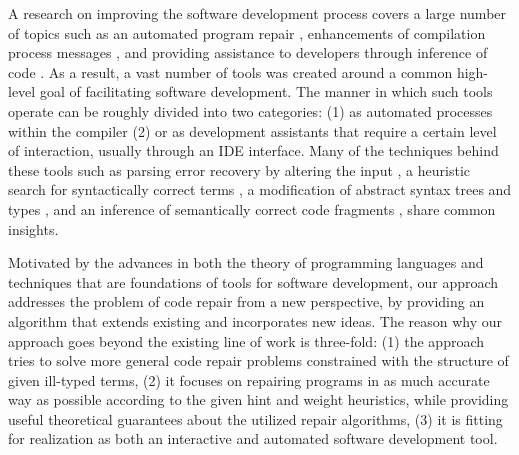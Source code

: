 A research on improving the software development process covers a large number of topics such as an automated
program repair
\cite{LeGoues:2012:ROI:2330163.2330296,WeiETAL10AutomatedFixingProgramsContracts,PeiETAL11CodebasedAutomatedProgramFixing},
enhancements of compilation process messages
\cite{Burke87apractical,Hammond198451,Lerner:2007:STM:1250734.1250783}, and
providing assistance to developers through inference of code
\cite{GveroETAL13CompleteCompletionTypesWeights,MandelinetALL2005Jungloid,KneussETAL13SynthesisModuloRecursiveFunctions,KuncakETAL13ExecutingSpecificationsSynthesisConstraintSolvingInvitedTalk,PerelmanGBG12}.
As a result, a vast number of tools was created around a common
high-level goal of facilitating software development.
The manner in which such tools operate can be roughly divided into two
categories: (1) as automated processes within the compiler 
(2) or as development assistants that require a certain level of
interaction, usually through an IDE interface.
Many of the techniques behind these tools such as parsing error recovery by altering the
input \cite{Burke87apractical}, a heuristic search for syntactically
correct terms \cite{PerelmanGBG12}, a modification of
abstract syntax trees and types \cite{Lerner:2007:STM:1250734.1250783}, and an inference
of semantically correct code fragments
\cite{KneussETAL13SynthesisModuloRecursiveFunctions}, share common insights.

Motivated by the advances in both the theory of programming languages and
techniques that are foundations of tools for software development, our
approach addresses the problem of code repair from a new perspective,
by providing an algorithm that extends existing and incorporates new
ideas.  The reason why our approach goes beyond the existing line of
work is three-fold: (1) the approach tries to solve more general code
repair problems constrained with the structure of given ill-typed
terms, (2) it focuses on repairing programs in as much accurate way as
possible according to the given hint and weight heuristics, while
providing useful theoretical guarantees about the utilized repair
algorithms, (3) it is fitting for realization as both an interactive
and automated software development tool.


